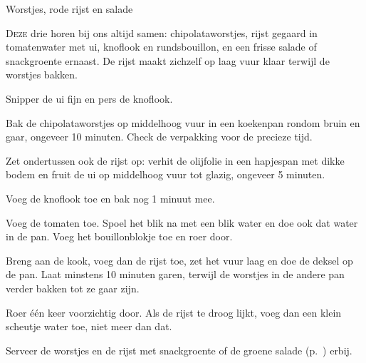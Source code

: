 \begin{recipe}{Worstjes, rode rijst en salade}
\label{recipe:worstjes-rode-rijst-salade}


\lettrine{D}{eze} drie horen bij ons altijd samen: chipolataworstjes, rijst
gegaard in tomatenwater met ui, knoflook en rundsbouillon, en een frisse
salade of snackgroente ernaast. De rijst maakt zichzelf op laag vuur klaar
terwijl de worstjes bakken.

\begin{ingredients}
\end{ingredients}

\begin{steps}
  \item Snipper de ui fijn en pers de knoflook.
  \item Bak de chipolataworstjes op middelhoog vuur in een koekenpan rondom
        bruin en gaar, ongeveer 10 minuten. Check de verpakking voor de
        precieze tijd.
  \item Zet ondertussen ook de rijst op: verhit de olijfolie in een hapjespan
        met dikke bodem en fruit de ui op middelhoog vuur tot glazig, ongeveer
        5 minuten.
  \item Voeg de knoflook toe en bak nog 1 minuut mee.
  \item Voeg de tomaten toe. Spoel het blik na met een blik water en doe ook
        dat water in de pan. Voeg het bouillonblokje toe en roer door.
  \item Breng aan de kook, voeg dan de rijst toe, zet het vuur laag en doe
        de deksel op de pan. Laat minstens 10 minuten garen, terwijl de
        worstjes in de andere pan verder bakken tot ze gaar zijn.
  \item Roer één keer voorzichtig door. Als de rijst te droog lijkt, voeg
        dan een klein scheutje water toe, niet meer dan dat.
  \item Serveer de worstjes en de rijst met snackgroente of de groene salade
        (p.~\pageref{recipe:groene-salade}) erbij.
\end{steps}

\end{recipe}

